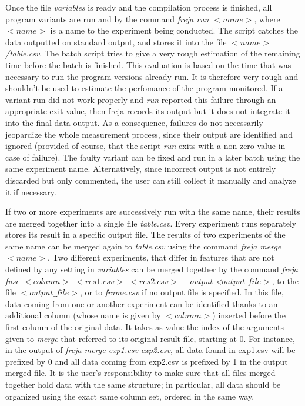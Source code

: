 Once the file \emph{variables} is ready and the compilation process is finished, all program variants are run and by the command \emph{freja run $<name>$}, where $<name>$ is a name to the experiment being conducted. The script catches the data outputted on standard output, and stores it into the file \emph{$<name>$/table.csv}. The batch script tries to give a very rough estimation of the remaining time before the batch is finished. This evaluation is based on the time that was necessary to run the program versions already run. It is therefore very rough and shouldn't be used to estimate the perfomance of the program monitored. If a variant run did not work properly and \emph{run} reported this failure through an appropriate exit value, then freja records its output but it does not integrate it into the final data output. As a consequence, failures do not necessarily jeopardize the whole measurement process, since their output are identified and ignored (provided of course, that the script \emph{run} exits with a non-zero value in case of failure). The faulty variant can be fixed and run in a later batch using the same experiment name. Alternatively, since incorrect output is not entirely discarded but only commented, the user can still collect it manually and analyze it if necessary.

If two or more experiments are successively run with the same name, their results are merged together into a single file \emph{table.csv}. Every experiment runs separately stores its result in a specific output file. The results of two experiments of the same name can be merged again to \emph{table.csv} using the command \emph{freja merge $<name>$}. Two different experiments, that differ in features that are not defined by any setting in \emph{variables} can be merged together by the command \emph{freja fuse $<column>$ $<res1.csv>$ $<res2.csv>$ -- output <$output\_file>$}, to the file $<output\_file>$, or to \emph{frame.csv} if no output file is specified. In this file, data coming from one or another experiment can be identified thanks to an additional column (whose name is given by \emph{$<column>$}) inserted before the first column of the original data. It takes as value the index of the arguments given to \emph{merge} that referred to its original result file, starting at 0. For instance, in the output of \emph{freja merge exp1.csv exp2.csv}, all data found in exp1.csv will be prefixed by 0 and all data coming from exp2.csv is prefixed by 1 in the output merged file. It is the user's responsibility to make sure that all files merged together hold data with the same structure; in particular, all data should be organized using the exact same column set, ordered in the same way.

